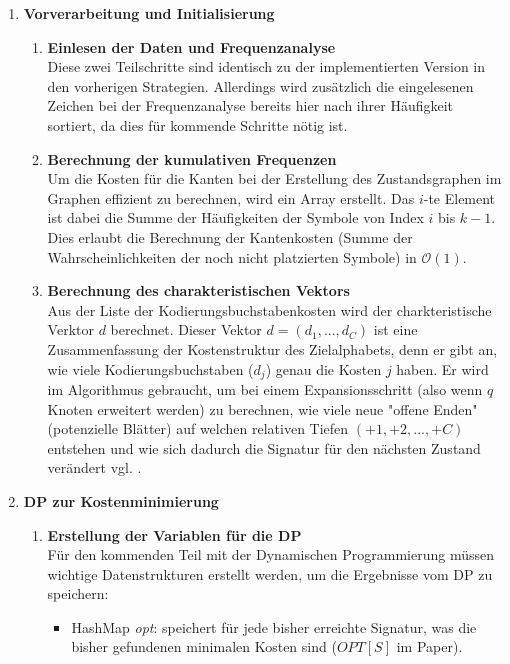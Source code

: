 \documentclass[a4paper,10pt,ngerman]{scrartcl}
\begin{document}
\begin{enumerate}
  \item \textbf{Vorverarbeitung und Initialisierung}
  \begin{enumerate}
    \item \textbf{Einlesen der Daten und Frequenzanalyse}\\
    Diese zwei Teilschritte sind identisch zu der implementierten Version in den vorherigen Strategien. Allerdings wird zusätzlich die eingelesenen Zeichen bei der Frequenzanalyse bereits hier nach ihrer Häufigkeit sortiert, da dies für kommende Schritte nötig ist. 
    \item \textbf{Berechnung der kumulativen Frequenzen}\\
    Um die Kosten für die Kanten bei der Erstellung des Zustandsgraphen im Graphen effizient zu berechnen, wird ein Array erstellt. Das $i$-te Element ist dabei die Summe der Häufigkeiten der Symbole von Index $i$ bis $k-1$. Dies erlaubt die Berechnung der Kantenkosten (Summe der Wahrscheinlichkeiten der noch nicht platzierten Symbole) in $\mathcal{O}(1)$. 
    \item \textbf{Berechnung des charakteristischen Vektors}\\
    Aus der Liste der Kodierungsbuchstabenkosten wird der charkteristische Verktor $d$ berechnet. Dieser Vektor $d=(d_1, ..., d_C)$ ist eine Zusammenfassung der Kostenstruktur des Zielalphabets, denn er gibt an, wie viele Kodierungsbuchstaben ($d_j$) genau die Kosten $j$ haben. Er wird im Algorithmus gebraucht, um bei einem Expansionsschritt (also wenn $q$ Knoten erweitert werden) zu berechnen, wie viele neue "offene Enden" (potenzielle Blätter) auf welchen relativen Tiefen $(+1, +2, ..., +C)$ entstehen und wie sich dadurch die Signatur für den nächsten Zustand verändert vgl. \cite[Lemma 3]{papergolinrote}.
  \end{enumerate}
  \item \textbf{DP zur Kostenminimierung}
  \begin{enumerate}
    \item \textbf{Erstellung der Variablen für die DP}\\
    Für den kommenden Teil mit der Dynamischen Programmierung müssen wichtige Datenstrukturen erstellt werden, um die Ergebnisse vom DP zu speichern: 
    \begin{itemize}
      \item HashMap \textit{opt}: speichert für jede bisher erreichte Signatur, was die bisher gefundenen minimalen Kosten sind ($OPT[S]$ im Paper).

\end{itemize}
\end{enumerate}
\end{enumerate}
\end{document}
